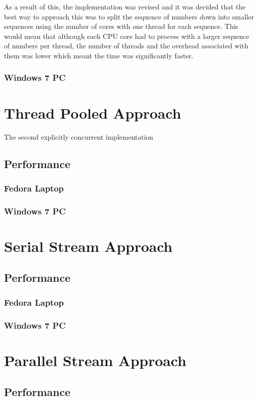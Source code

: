 \documentclass[]{report}
\begin{document}
As a result of this, the implementation was revised and it was decided that the best way to approach this was to split the sequence of numbers down into smaller sequences using the number of cores with one thread for each sequence. This would mean that although each CPU core had to process with a larger sequence of numbers per thread, the number of threads and the overhead associated with them was lower which meant the time was significantly faster.

\subsubsection{Windows 7 PC}
 
\section{Thread Pooled Approach}
The second explicitly concurrent implementation
\subsection{Performance}
\subsubsection{Fedora Laptop}
\subsubsection{Windows 7 PC}

\section{Serial Stream Approach}
\subsection{Performance}
\subsubsection{Fedora Laptop}
\subsubsection{Windows 7 PC}

\section{Parallel Stream Approach}
\subsection{Performance}
\end{document}

